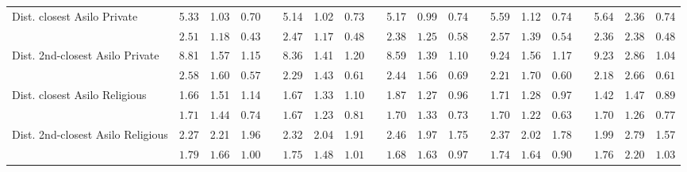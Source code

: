 \begin{center}
{\begin{longtable}{L{5cm} c c c p{.5cm} c c c p{.5cm} c c c p{.5cm} c c c p{.5cm} c c c}
Dist. closest Asilo Private & 5.33 &      1.03 &      0.70 & &      5.14 &      1.02 &      0.73 & &      5.17 &      0.99 &      0.74 & &      5.59 &      1.12 &      0.74 & &      5.64 &      2.36 &      0.74 \\*
& $\mathit{     2.51}$ & $\mathit{     1.18}$ & $\mathit{     0.43}$ & & $\mathit{     2.47}$ & $\mathit{     1.17}$ & $\mathit{     0.48}$ & & $\mathit{     2.38}$ & $\mathit{     1.25}$ & $\mathit{     0.58}$ & & $\mathit{     2.57}$ & $\mathit{     1.39}$ & $\mathit{     0.54}$ & & $\mathit{     2.36}$ & $\mathit{     2.38}$ & $\mathit{     0.48}$ \\[.7em]
Dist. 2nd-closest Asilo Private & 8.81 &      1.57 &      1.15 & &      8.36 &      1.41 &      1.20 & &      8.59 &      1.39 &      1.10 & &      9.24 &      1.56 &      1.17 & &      9.23 &      2.86 &      1.04 \\*
& $\mathit{     2.58}$ & $\mathit{     1.60}$ & $\mathit{     0.57}$ & & $\mathit{     2.29}$ & $\mathit{     1.43}$ & $\mathit{     0.61}$ & & $\mathit{     2.44}$ & $\mathit{     1.56}$ & $\mathit{     0.69}$ & & $\mathit{     2.21}$ & $\mathit{     1.70}$ & $\mathit{     0.60}$ & & $\mathit{     2.18}$ & $\mathit{     2.66}$ & $\mathit{     0.61}$ \\[.7em]
Dist. closest Asilo Religious & 1.66 &      1.51 &      1.14 & &      1.67 &      1.33 &      1.10 & &      1.87 &      1.27 &      0.96 & &      1.71 &      1.28 &      0.97 & &      1.42 &      1.47 &      0.89 \\*
& $\mathit{     1.71}$ & $\mathit{     1.44}$ & $\mathit{     0.74}$ & & $\mathit{     1.67}$ & $\mathit{     1.23}$ & $\mathit{     0.81}$ & & $\mathit{     1.70}$ & $\mathit{     1.33}$ & $\mathit{     0.73}$ & & $\mathit{     1.70}$ & $\mathit{     1.22}$ & $\mathit{     0.63}$ & & $\mathit{     1.70}$ & $\mathit{     1.26}$ & $\mathit{     0.77}$ \\[.7em]
Dist. 2nd-closest Asilo Religious & 2.27 &      2.21 &      1.96 & &      2.32 &      2.04 &      1.91 & &      2.46 &      1.97 &      1.75 & &      2.37 &      2.02 &      1.78 & &      1.99 &      2.79 &      1.57 \\*
& $\mathit{     1.79}$ & $\mathit{     1.66}$ & $\mathit{     1.00}$ & & $\mathit{     1.75}$ & $\mathit{     1.48}$ & $\mathit{     1.01}$ & & $\mathit{     1.68}$ & $\mathit{     1.63}$ & $\mathit{     0.97}$ & & $\mathit{     1.74}$ & $\mathit{     1.64}$ & $\mathit{     0.90}$ & & $\mathit{     1.76}$ & $\mathit{     2.20}$ & $\mathit{     1.03}$ \\[.7em]

\end{longtable}}
\end{center}

